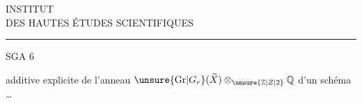 \begin{center}
INSTITUT\\
DES HAUTES ÉTUDES SCIENTIFIQUES\\[-.4ex]
\rule{1.4cm}{.4pt}
\end{center}

SGA 6

 additive explicite de l'anneau $\unsure{\mathrm{Gr}|G_{r}}(\widetilde X)\otimes_{\unsure{\mathbb Z|Z|2}}\mathbb Q$ d'un schéma \ldots
